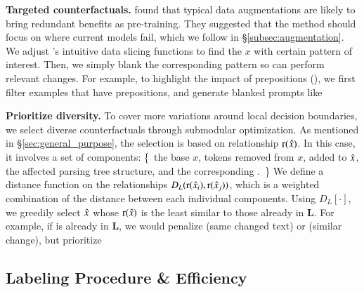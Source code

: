 \textbf{Targeted counterfactuals.}
\citet{longpre2020effective} found that typical data augmentations are likely to bring redundant benefits as pre-training.
They suggested that the method should focus on where current models fail, which we follow in \S\ref{subsec:augmentation}.
We adjust \citet{chen2019slice}'s intuitive data slicing functions to find the $x$ with certain pattern of interest.
Then, we simply blank the corresponding pattern so \sysname can perform relevant changes.
For example, to highlight the impact of prepositions (), we first filter examples that have prepositions, and generate blanked prompts like 


\textbf{Prioritize diversity.}
To cover more variations around local decision boundaries, we select diverse counterfactuals through submodular optimization.
As mentioned in \S\ref{sec:general_purpose}, the selection is based on relationship $\operatorname*{r}(\hat{x})$.
In this case, it involves a set of components: \{\ the base $x$, tokens removed from $x$, added to $\hat{x}$, the affected parsing tree structure, and the corresponding \tagstr.\ \}
We define a distance function on the relationships $D_L(\operatorname*{r}(\hat{x}_i), \operatorname*{r}(\hat{x}_j))$, which is a weighted combination of the distance between each individual components.
Using $D_L[\boldsymbol{\cdot}]$, we greedily select $\hat{x}$ whose $\operatorname*{r}(\hat{x})$ is the least similar to those already in $\mathbf{L}$.
For example, if  is already in $\mathbf{L}$, we would penalize  (same changed text) or  (similar  change), but prioritize 






\subsection{Labeling Procedure \& Efficiency}
\label{subsec:label_efficiency}

